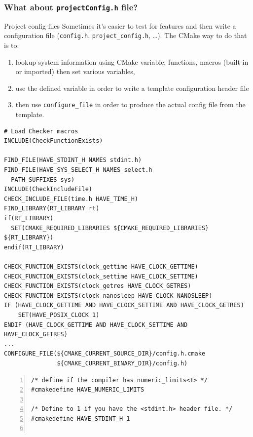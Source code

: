 \documentclass[compress,slidestop,table
              ]
               {beamer}
\newcommand{\fname}[1]{\texttt{#1}}
\begin{document}
\begin{frame}
\frametitle{What about \fname{projectConfig.h} file?}
\begin{block}{Project config files}
Sometimes it's easier to test for features and then write a
configuration file (\fname{config.h}, \fname{project\_config.h}, \ldots).
The CMake way to do that is to:
\vspace*{0.4cm}
\begin{enumerate}
\item lookup system information using CMake variable, functions, macros (built-in or imported)
      then set various variables,
\item use the defined variable in order to write a template configuration
      header file
\item then use \lstinline!configure_file! in order to produce the actual
      config file from the template.
\end{enumerate}
\end{block}

\begin{lstlisting}[basicstyle=\tiny,caption=Excerpt from CERTI project's main \fname{CMakeLists.txt}]
# Load Checker macros
INCLUDE(CheckFunctionExists)

FIND_FILE(HAVE_STDINT_H NAMES stdint.h)
FIND_FILE(HAVE_SYS_SELECT_H NAMES select.h
  PATH_SUFFIXES sys)
INCLUDE(CheckIncludeFile)
CHECK_INCLUDE_FILE(time.h HAVE_TIME_H)
FIND_LIBRARY(RT_LIBRARY rt)
if(RT_LIBRARY)
  SET(CMAKE_REQUIRED_LIBRARIES ${CMAKE_REQUIRED_LIBRARIES} ${RT_LIBRARY})
endif(RT_LIBRARY)

CHECK_FUNCTION_EXISTS(clock_gettime HAVE_CLOCK_GETTIME)
CHECK_FUNCTION_EXISTS(clock_settime HAVE_CLOCK_SETTIME)
CHECK_FUNCTION_EXISTS(clock_getres HAVE_CLOCK_GETRES)
CHECK_FUNCTION_EXISTS(clock_nanosleep HAVE_CLOCK_NANOSLEEP)
IF (HAVE_CLOCK_GETTIME AND HAVE_CLOCK_SETTIME AND HAVE_CLOCK_GETRES)
    SET(HAVE_POSIX_CLOCK 1)
ENDIF (HAVE_CLOCK_GETTIME AND HAVE_CLOCK_SETTIME AND HAVE_CLOCK_GETRES)
...
CONFIGURE_FILE(${CMAKE_CURRENT_SOURCE_DIR}/config.h.cmake
               ${CMAKE_CURRENT_BINARY_DIR}/config.h)
\end{lstlisting}
\begin{Verbatim}[fontsize=\tiny,numbers=left,frame=topline,label=Excerpt from CERTI \fname{config.h.cmake}]
/* define if the compiler has numeric_limits<T> */
#cmakedefine HAVE_NUMERIC_LIMITS

/* Define to 1 if you have the <stdint.h> header file. */
#cmakedefine HAVE_STDINT_H 1


\end{Verbatim}
\end{frame}
\end{document}
